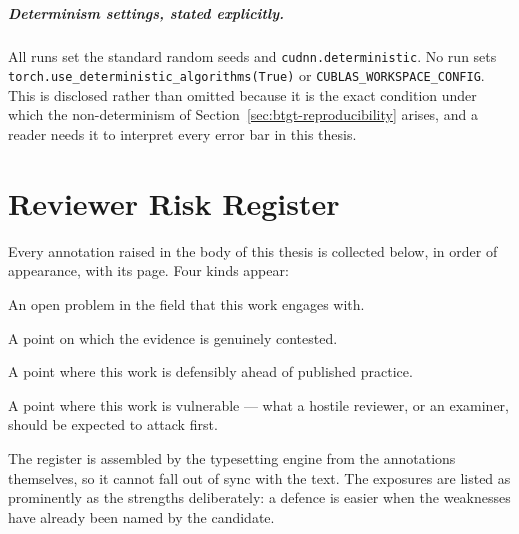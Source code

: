 
\paragraph{Determinism settings, stated explicitly.} All runs set the standard random seeds
and \texttt{cudnn.deterministic}. No run sets
\texttt{torch.use\_deterministic\_algorithms(True)} or \texttt{CUBLAS\_WORKSPACE\_CONFIG}.
This is disclosed rather than omitted because it is the exact condition under which the
non-determinism of Section~\ref{sec:btgt-reproducibility} arises, and a reader needs it to
interpret every error bar in this thesis.

\chapter{Reviewer Risk Register}
\label{app:register}

Every annotation raised in the body of this thesis is collected below, in order of
appearance, with its page. Four kinds appear:

\begin{description}[leftmargin=3.2cm,style=nextline]
  \item[RESEARCH GAP] An open problem in the field that this work engages with.
  \item[GREY AREA] A point on which the evidence is genuinely contested.
  \item[OUR EDGE] A point where this work is defensibly ahead of published practice.
  \item[EXPOSURE] A point where this work is vulnerable --- what a hostile reviewer, or an
    examiner, should be expected to attack first.
\end{description}

The register is assembled by the typesetting engine from the annotations themselves, so it
cannot fall out of sync with the text. The exposures are listed as prominently as the
strengths deliberately: a defence is easier when the weaknesses have already been named by
the candidate.

\listofannotations
